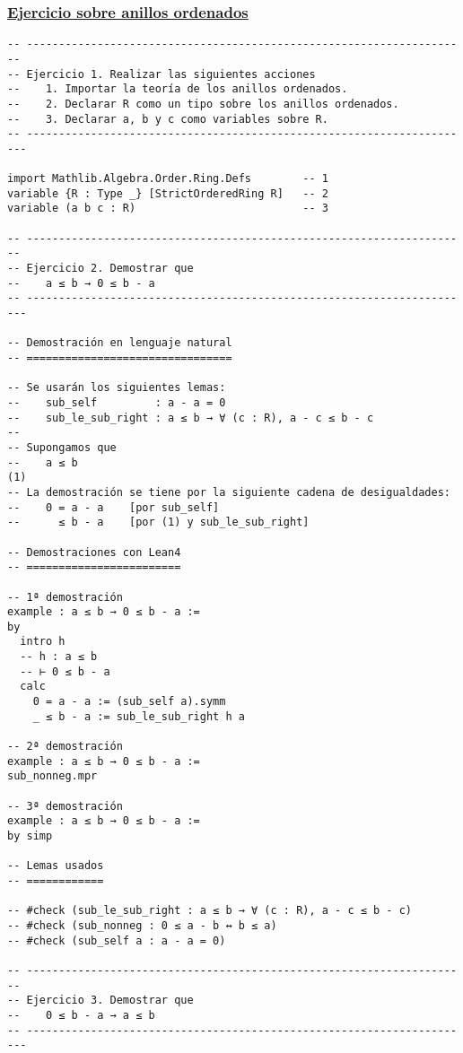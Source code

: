 \subsubsection{\href{./src/Basicos/Ejercicio\_sobre\_anillos\_ordenados.lean}{Ejercicio sobre anillos ordenados}}
\label{sec:orgb18dc0e}
\begin{verbatim}
-- ---------------------------------------------------------------------
-- Ejercicio 1. Realizar las siguientes acciones
--    1. Importar la teoría de los anillos ordenados.
--    2. Declarar R como un tipo sobre los anillos ordenados.
--    3. Declarar a, b y c como variables sobre R.
-- ----------------------------------------------------------------------

import Mathlib.Algebra.Order.Ring.Defs        -- 1
variable {R : Type _} [StrictOrderedRing R]   -- 2
variable (a b c : R)                          -- 3

-- ---------------------------------------------------------------------
-- Ejercicio 2. Demostrar que
--    a ≤ b → 0 ≤ b - a
-- ----------------------------------------------------------------------

-- Demostración en lenguaje natural
-- ================================

-- Se usarán los siguientes lemas:
--    sub_self         : a - a = 0
--    sub_le_sub_right : a ≤ b → ∀ (c : R), a - c ≤ b - c
--
-- Supongamos que
--    a ≤ b                                                          (1)
-- La demostración se tiene por la siguiente cadena de desigualdades:
--    0 = a - a    [por sub_self]
--      ≤ b - a    [por (1) y sub_le_sub_right]

-- Demostraciones con Lean4
-- ========================

-- 1ª demostración
example : a ≤ b → 0 ≤ b - a :=
by
  intro h
  -- h : a ≤ b
  -- ⊢ 0 ≤ b - a
  calc
    0 = a - a := (sub_self a).symm
    _ ≤ b - a := sub_le_sub_right h a

-- 2ª demostración
example : a ≤ b → 0 ≤ b - a :=
sub_nonneg.mpr

-- 3ª demostración
example : a ≤ b → 0 ≤ b - a :=
by simp

-- Lemas usados
-- ============

-- #check (sub_le_sub_right : a ≤ b → ∀ (c : R), a - c ≤ b - c)
-- #check (sub_nonneg : 0 ≤ a - b ↔ b ≤ a)
-- #check (sub_self a : a - a = 0)

-- ---------------------------------------------------------------------
-- Ejercicio 3. Demostrar que
--    0 ≤ b - a → a ≤ b
-- ----------------------------------------------------------------------


\end{verbatim}
